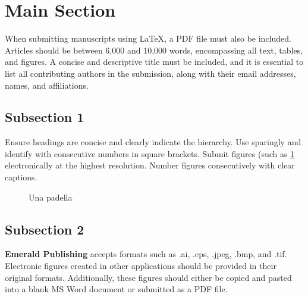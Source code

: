 \section{Main Section}
\label{sec:main_section}
When submitting manuscripts using \LaTeX, a PDF file must also be included. 
Articles should be between 6,000 and 10,000 words, encompassing all text, tables, and figures. 
A concise and descriptive title must be included, and it is essential to list all contributing authors in the submission, along with their email addresses, names, and affiliations.

\subsection{Subsection 1}
Ensure headings are concise and clearly indicate the hierarchy. 
Use sparingly and identify with consecutive numbers in square brackets.
Submit figures (such as \cref{fig-1} electronically at the highest resolution. Number figures consecutively with clear captions.

\begin{figure}[ht]
 \centering
 \caption{Una padella}
 \label{fig-1}
\end{figure}

\subsection{Subsection 2}
\textbf{Emerald Publishing} accepts formats such as .ai, .eps, .jpeg, .bmp, and .tif. Electronic figures created in other applications should be provided in their original formats. 
Additionally, these figures should either be copied and pasted into a blank MS Word document or submitted as a PDF file.